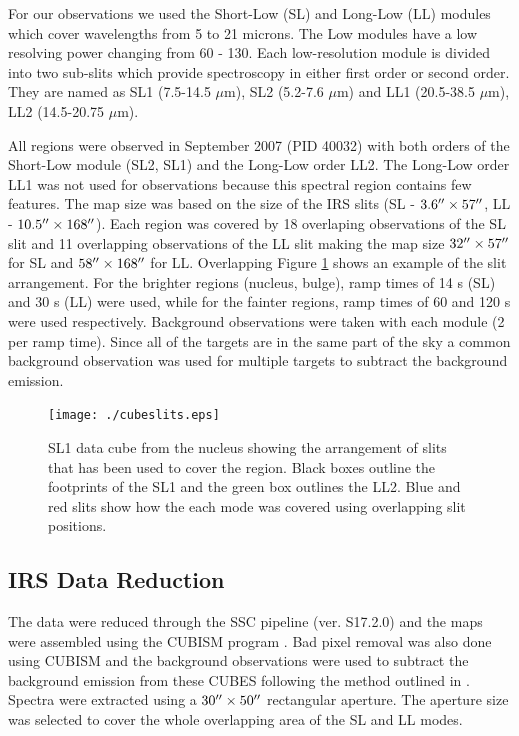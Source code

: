 For our observations we used the Short-Low (SL) and Long-Low (LL) modules which cover wavelengths from 5 to 21 microns. The Low modules have a low resolving power changing from 60 - 130. Each low-resolution module is divided into two sub-slits which provide spectroscopy in either first order or second order. They are named as SL1 (7.5-14.5 $\mu$m), SL2 (5.2-7.6 $\mu$m) and LL1 (20.5-38.5 $\mu$m), LL2 (14.5-20.75 $\mu$m).

All regions were observed in September 2007 (PID 40032) with both orders of the Short-Low module (SL2, SL1) and the Long-Low order LL2. The Long-Low order LL1 was not used for observations because this spectral region contains few features. The map size was based on the size of the IRS slits (SL - $3.6\hbox{$^{\prime\prime}$} \times 57\hbox{$^{\prime\prime}$}$, LL - $10.5\hbox{$^{\prime\prime}$} \times 168\hbox{$^{\prime\prime}$}$). Each region was covered by 18 overlaping observations of the SL slit and 11 overlapping observations of the LL slit making the map size $32\hbox{$^{\prime\prime}$} \times 57\hbox{$^{\prime\prime}$}$ for SL and $58\hbox{$^{\prime\prime}$} \times 168\hbox{$^{\prime\prime}$}$ for LL. Overlapping Figure \ref{slits} shows an example of the slit arrangement. For the brighter regions (nucleus, bulge), ramp times of 14 s (SL) and 30 s (LL) were used, while for the fainter regions, ramp times of 60 and 120 s were used respectively. Background observations were taken with each module (2 per ramp time). Since all of the targets are in the same part of the sky a common background observation was used for multiple targets to subtract the background emission. 


\begin{figure}
\centering
\texttt{[image: ./cubeslits.eps]}
\caption{SL1 data cube from the nucleus showing the arrangement of slits that has been used to cover the region. Black boxes outline the footprints of the SL1 and the green box outlines the LL2. Blue and red slits show how the each mode was covered using overlapping slit positions.}
\label{slits}
\end{figure}

\subsection{IRS Data Reduction}

The data were reduced through the SSC pipeline (ver. S17.2.0) and the maps were assembled using the CUBISM program \citep{Smith:2007fk}. Bad pixel removal was also done using CUBISM and the background observations were used to subtract the background emission from these CUBES following the method outlined in \citet{Gordon:2008lr}. Spectra were extracted using a $30\hbox{$^{\prime\prime}$}\times50\hbox{$^{\prime\prime}$}$   rectangular aperture. The aperture size was selected to cover the whole overlapping area of the SL and LL modes.

